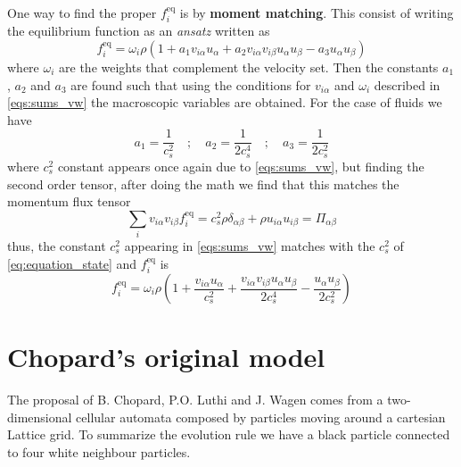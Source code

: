 One way to find the proper $f_i^{\text{eq}}$ is by \textbf{moment matching}. This consist of writing the equilibrium function as an \textit{ansatz} written as
\begin{equation}
    f_i^{\text{eq}} = \omega_i\rho(1 + a_1v_{i\alpha}u_\alpha + a_2v_{i\alpha}v_{i\beta}u_\alpha u_\beta - a_3u_\alpha u_\beta)
\end{equation}
where $\omega_i$ are the weights that complement the velocity set. Then the constants $a_1$, $a_2$ and $a_3$ are found such that using the conditions for $v_{i\alpha}$ and $\omega_i$ described in \ref{eqs:sums_vw} the macroscopic variables are obtained. For the case of fluids we have
\begin{equation}\label{eq:moment_matching_constants}
    a_1 = \frac{1}{c_s^2}\quad;\quad a_2 = \frac{1}{2c_s^4}\quad;\quad a_3 = \frac{1}{2c_s^2}
\end{equation}
where $c_s^2$ constant appears once again due to \ref{eqs:sums_vw}, but finding the second order tensor, after doing the math we find that this matches the momentum flux tensor
\begin{equation}
    \sum_i v_{i\alpha}v_{i\beta}f_i^{\text{eq}} = c_s^2\rho\delta_{\alpha\beta} + \rho u_{i\alpha}u_{i\beta} = \Pi_{\alpha\beta}
\end{equation}
thus, the constant $c_s^2$ appearing in \ref{eqs:sums_vw} matches with the $c_s^2$ of \ref{eq:equation_state} and $f_i^{\text{eq}}$ is
\begin{equation}
    f_i^{\text{eq}} = \omega_i\rho\left(1 + \frac{v_{i\alpha}u_\alpha}{c_s^2} + \frac{v_{i\alpha}v_{i\beta}u_\alpha u_\beta}{2c_s^4} - \frac{u_\alpha u_\beta}{2c_s^2}\right)
\end{equation}

\section{Chopard's original model}
The proposal of B. Chopard, P.O. Luthi and J. Wagen comes from a two-dimensional cellular automata composed by particles moving around a cartesian Lattice grid. To summarize the evolution rule we have a black particle connected to four white neighbour particles. 

